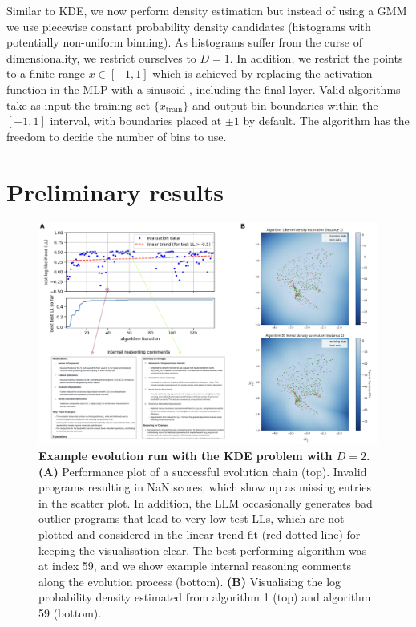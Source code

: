 \documentclass[12pt, legalpaper]{article}
\begin{document}
Similar to KDE, we now perform density estimation but instead of using a GMM we use piecewise constant probability density candidates (histograms with potentially non-uniform binning). 
As histograms suffer from the curse of dimensionality, we restrict ourselves to $D=1$. 
In addition, we restrict the points to a finite range $x \in [-1, 1]$ which is achieved by replacing the activation function in the MLP with a sinusoid \citep{sitzmann2020implicit}, including the final layer. 
Valid algorithms take as input the training set $\{ x_{\text{train}} \}$ and output bin boundaries within the $[-1, 1]$ interval, with boundaries placed at $\pm 1$ by default. 
The algorithm has the freedom to decide the number of bins to use. 


\section{Preliminary results}


\begin{figure}[t]
    \centering
    \includegraphics[width=\textwidth]{figures/challenge_KDE.png}
    \caption{
    \textbf{Example evolution run with the KDE problem with $D=2$.} 
    \textbf{(A)} Performance plot of a successful evolution chain (top). 
    Invalid programs resulting in NaN scores, which show up as missing entries in the scatter plot. 
    In addition, the LLM occasionally generates bad outlier programs that lead to very low test LLs, which are not plotted and considered in the linear trend fit (red dotted line) for keeping the visualisation clear. 
    The best performing algorithm was at index 59, and we show example internal reasoning comments along the evolution process (bottom). 
    \textbf{(B)} Visualising the log probability density estimated from algorithm 1 (top) and algorithm 59 (bottom). 
    }
    \label{fig:challenge_KDE}
\end{figure}
\end{document}
